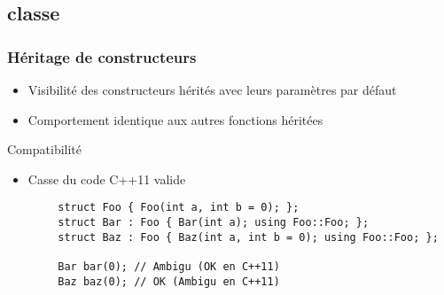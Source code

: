 \documentclass[C++.tex]{subfiles}
\begin{document}
\subsection*{classe}
\begin{frame}[fragile]
	\frametitle{Héritage de constructeurs}
	\begin{itemize}
		\item Visibilité des constructeurs hérités avec leurs paramètres par défaut


		\item Comportement identique aux autres fonctions héritées
	\end{itemize}


	\begin{alertblock}{Compatibilité}
		\begin{itemize}
			\item Casse du code C++11 valide
		\end{itemize}
	\end{alertblock}

	\begin{verbatim}
		struct Foo { Foo(int a, int b = 0); };
		struct Bar : Foo { Bar(int a); using Foo::Foo; };
		struct Baz : Foo { Baz(int a, int b = 0); using Foo::Foo; };

		Bar bar(0); // Ambigu (OK en C++11)
		Baz baz(0); // OK (Ambigu en C++11)
	\end{verbatim}

\end{frame}
\end{document}
